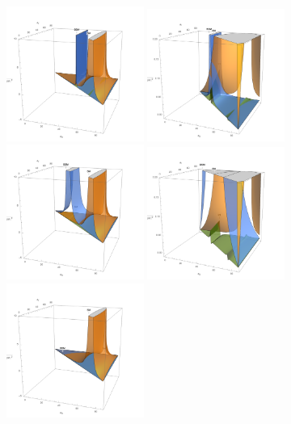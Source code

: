 \begin{figure}[ht]
    \centering
    \includegraphics[width=0.4\textwidth]{chapters/RelatedWorks/sectionBSM/figures/2HDM_120_10.png}
    \includegraphics[width=0.4\textwidth]{chapters/RelatedWorks/sectionBSM/figures/zoom_2HDM_140_10.png}
    \includegraphics[width=0.4\textwidth]{chapters/RelatedWorks/sectionBSM/figures/2HDM_140_40.png}
    \includegraphics[width=0.4\textwidth]{chapters/RelatedWorks/sectionBSM/figures/zoom_2HDM_140_40.png}
    \includegraphics[width=0.4\textwidth]{chapters/RelatedWorks/sectionBSM/figures/2HDM_200_40.png}

\end{figure}
